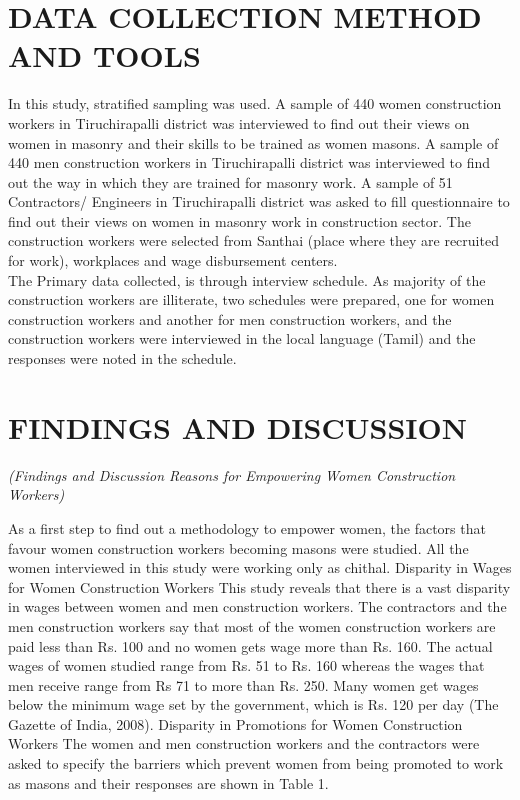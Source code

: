\documentclass[12pt]{report}
\begin{document}
	
	\section{DATA COLLECTION METHOD AND TOOLS}
	 In  this  study,  stratified  sampling  was  used.  A  sample  of  440  women  construction workers  in  Tiruchirapalli  district  was  interviewed  to  find  out  their  views  on  women  in masonry  and  their  skills  to  be  trained  as  women  masons.  A  sample  of  440  men construction  workers  in  Tiruchirapalli  district  was  interviewed  to  find  out  the  way  in which  they  are  trained  for  masonry  work.  A  sample  of  51  Contractors/  Engineers  in Tiruchirapalli  district  was  asked  to  fill  questionnaire  to  find  out  their  views  on  women  in masonry  work  in  construction  sector.    The  construction  workers  were  selected  from Santhai  (place  where  they  are  recruited  for  work),  workplaces  and  wage  disbursement centers.\\
	 
	 The  Primary  data  collected,  is  through  interview  schedule.  As  majority  of  the construction  workers  are  illiterate,  two  schedules  were  prepared,  one  for  women construction  workers  and  another  for  men  construction  workers,  and  the  construction workers  were  interviewed  in  the  local  language  (Tamil)  and  the  responses  were  noted  in the  schedule.     
	
	
	
	\section{FINDINGS AND DISCUSSION}
	\textit{(Findings and Discussion   Reasons for Empowering Women Construction Workers)}
	
	As  a  first  step  to  find  out  a  methodology  to  empower  women,  the  factors  that favour  women  construction  workers  becoming  masons  were  studied.    All  the  women interviewed  in  this  study  were  working  only  as  chithal.     Disparity  in  Wages  for  Women  Construction  Workers   This  study  reveals  that  there  is  a  vast  disparity  in  wages  between  women  and  men construction  workers.  The  contractors  and  the  men  construction  workers  say  that  most  of the  women  construction  workers  are  paid  less  than  Rs.  100 and no women gets  wage more  than  Rs.  160.  The actual  wages  of  women  studied  range  from  Rs.  51  to  Rs.  160 whereas  the  wages  that  men  receive  range  from  Rs  71  to  more  than  Rs.  250.  Many women  get  wages  below  the  minimum  wage  set  by  the  government,  which  is  Rs.  120  per day  (The  Gazette  of  India,  2008). Disparity  in  Promotions  for  Women  Construction  Workers The  women  and  men  construction  workers  and  the  contractors  were  asked  to specify  the  barriers  which  prevent  women  from  being  promoted  to  work  as  masons  and their  responses  are  shown  in  Table  1.  \\
	
\end{document}
